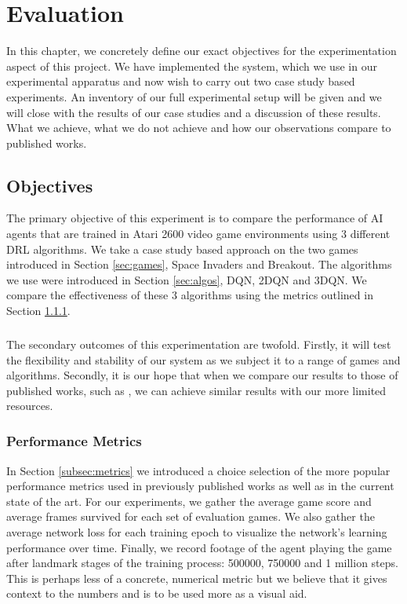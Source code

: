 \chapter{Evaluation}
In this chapter, we concretely define our exact objectives for the experimentation aspect of this
project. We have implemented the system, which we use in our experimental apparatus and now wish to
carry out two case study based experiments. An inventory of our full experimental setup will be
given and we will close with the results of our case studies and a discussion of these results. What
we achieve, what we do not achieve and how our observations compare to published works.

\section{Objectives} \label{sec:eval_objectives}
The primary objective of this experiment is to compare the performance of AI agents that are trained
in Atari 2600 video game environments using 3 different DRL algorithms. We take a case study based
approach on the two games introduced in Section \ref{sec:games}, Space Invaders and Breakout. The
algorithms we use were introduced in Section \ref{sec:algos}, DQN, 2DQN and 3DQN. We compare the
effectiveness of these 3 algorithms using the metrics outlined in Section \ref{subsec:performance}.
\paragraph{}

The secondary outcomes of this experimentation are twofold. Firstly, it will test the flexibility
and stability of our system as we subject it to a range of games and algorithms. Secondly, it is our
hope that when we compare our results to those of published works, such as
\citet{human,doubleq,dueling}, we can achieve similar results with our more limited resources.
\paragraph{}

\subsection{Performance Metrics} \label{subsec:performance}
In Section \ref{subsec:metrics} we introduced a choice selection of the more popular performance
metrics used in previously published works as well as in the current state of the art. For our
experiments, we gather the average game score and average frames survived for each set of evaluation
games. We also gather the average network loss for each training epoch to visualize the network's
learning performance over time. Finally, we record footage of the agent playing the game after
landmark stages of the training process: 500000, 750000 and 1 million steps. This is perhaps less of a
concrete, numerical metric but we believe that it gives context to the numbers and is to be used
more as a visual aid.

